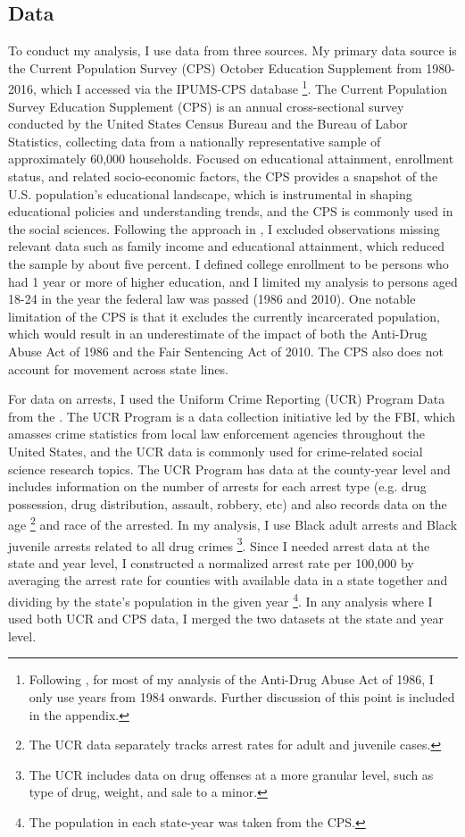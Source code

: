 \documentclass{article}
\begin{document}
\subsection{Data}
To conduct my analysis, I use data from three sources. My primary data source is the Current Population Survey (CPS) October Education Supplement from 1980-2016, which I accessed via the IPUMS-CPS database \citep{ipums_cps} \footnote{Following \cite{britton2022}, for most of my analysis of the Anti-Drug Abuse Act of 1986, I only use years from 1984 onwards. Further discussion of this point is included in the appendix.}. The Current Population Survey Education Supplement (CPS) is an annual cross-sectional survey conducted by the United States Census Bureau and the Bureau of Labor Statistics, collecting data from a nationally representative sample of approximately 60,000 households. Focused on educational attainment, enrollment status, and related socio-economic factors, the CPS provides a snapshot of the U.S. population's educational landscape, which is instrumental in shaping educational policies and understanding trends, and the CPS is commonly used in the social sciences. Following the approach in \cite{britton2022}, I excluded observations missing relevant data such as family income and educational attainment, which reduced the sample by about five percent. I defined college enrollment to be persons who had 1 year or more of higher education, and I limited my analysis to persons aged 18-24 in the year the federal law was passed (1986 and 2010). One notable limitation of the CPS is that it excludes the currently incarcerated population, which would result in an underestimate of the impact of both the Anti-Drug Abuse Act of 1986 and the Fair Sentencing Act of 2010. The CPS also does not account for movement across state lines.

For data on arrests, I used the Uniform Crime Reporting (UCR) Program Data from the \cite{ucr}. The UCR Program is a data collection initiative led by the FBI, which amasses crime statistics from local law enforcement agencies throughout the United States, and the UCR data is commonly used for crime-related social science research topics. The UCR Program has data at the county-year level and includes information on the number of arrests for each arrest type (e.g. drug possession, drug distribution, assault, robbery, etc) and also records data on the age \footnote{The UCR data separately tracks arrest rates for adult and juvenile cases.} and race of the arrested. In my analysis, I use Black adult arrests and Black juvenile arrests related to all drug crimes \footnote{The UCR includes data on drug offenses at a more granular level, such as type of drug, weight, and sale to a minor.}. Since I needed arrest data at the state and year level, I constructed a normalized arrest rate per 100,000 by averaging the arrest rate for counties with available data in a state together and dividing by the state's population in the given year \footnote{The population in each state-year was taken from the CPS.}. In any analysis where I used both UCR and CPS data, I merged the two datasets at the state and year level.
\end{document}
